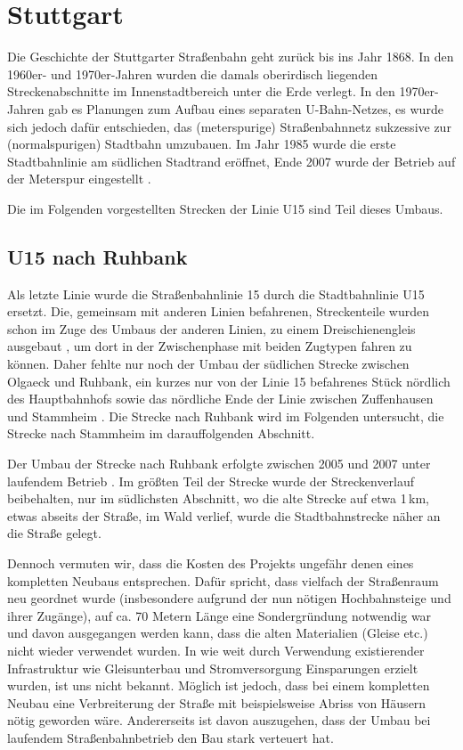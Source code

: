 \section{Stuttgart}

Die Geschichte der Stuttgarter Straßenbahn geht zurück bis ins Jahr 1868. In den
1960er- und 1970er-Jahren wurden die damals oberirdisch liegenden
Streckenabschnitte im Innenstadtbereich unter die Erde verlegt. In den
1970er-Jahren gab es Planungen zum Aufbau eines separaten U-Bahn-Netzes, es wurde sich
jedoch dafür entschieden, das (meterspurige) Straßenbahnnetz sukzessive zur
(normalspurigen) Stadtbahn umzubauen. Im Jahr 1985 wurde die erste
Stadtbahnlinie am südlichen Stadtrand eröffnet, Ende 2007 wurde der Betrieb auf
der Meterspur eingestellt \cite{SSBgeschichte}.

Die im Folgenden vorgestellten Strecken der Linie U15 sind Teil dieses Umbaus.

\subsection*{U15 nach Ruhbank}

Als letzte \cite{u15vorinfo} Linie wurde die Straßenbahnlinie 15 durch die
Stadtbahnlinie U15 ersetzt. Die, gemeinsam mit anderen Linien befahrenen,
Streckenteile wurden schon im Zuge des Umbaus der anderen Linien, zu einem
Dreischienengleis ausgebaut \cite{beob}, um dort in der Zwischenphase mit beiden
Zugtypen fahren zu können. Daher fehlte nur noch der Umbau der südlichen
Strecke zwischen Olgaeck und Ruhbank, ein kurzes nur von der Linie 15 befahrenes
Stück nördlich des Hauptbahnhofs sowie das nördliche Ende der Linie zwischen
Zuffenhausen und Stammheim \cite{u15mail}. Die Strecke nach Ruhbank wird im
Folgenden untersucht, die Strecke nach Stammheim im darauffolgenden Abschnitt.

Der Umbau der Strecke nach Ruhbank erfolgte zwischen 2005 und 2007 unter
laufendem Betrieb \cite{u15seb}. Im größten Teil der Strecke wurde der
Streckenverlauf beibehalten, nur im südlichsten Abschnitt, wo die alte Strecke
auf etwa 1\,km, etwas abseits der Straße, im Wald verlief, wurde die
Stadtbahnstrecke näher an die Straße gelegt.

Dennoch vermuten wir, dass die Kosten des Projekts ungefähr denen eines
kompletten Neubaus entsprechen. Dafür spricht, dass vielfach der Straßenraum
neu geordnet wurde (insbesondere aufgrund der nun nötigen Hochbahnsteige und
ihrer Zugänge), auf ca. 70 Metern Länge eine Sondergründung notwendig war
\cite{u15mail} und davon ausgegangen werden kann, dass die alten Materialien
(Gleise etc.) nicht wieder verwendet wurden. In wie weit durch Verwendung
existierender Infrastruktur wie Gleisunterbau und Stromversorgung Einsparungen
erzielt wurden, ist uns nicht bekannt. Möglich ist jedoch, dass bei einem
kompletten Neubau eine Verbreiterung der Straße mit beispielsweise Abriss von
Häusern nötig geworden wäre.  Andererseits ist davon auszugehen, dass der Umbau
bei laufendem Straßenbahnbetrieb den Bau stark verteuert hat.

